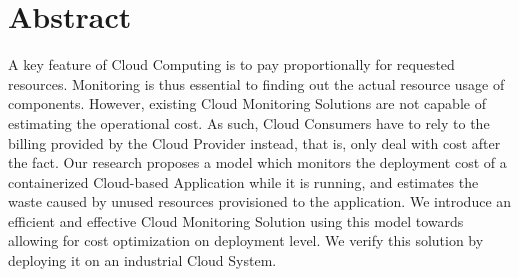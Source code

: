 \begingroup
\let\clearpage\relax
\let\cleardoublepage\relax
\let\cleardoublepage\relax

\chapter*{Abstract}
A key feature of Cloud Computing is to pay proportionally for requested resources. Monitoring is thus essential to finding out the actual resource usage of components. However, existing Cloud Monitoring Solutions are not capable of estimating the operational cost.
As such, Cloud Consumers have to rely to the billing provided by the Cloud Provider instead, that is, only deal with cost after the fact.
Our research proposes a model which monitors the deployment cost of a containerized Cloud-based Application while it is running, and estimates the waste caused by unused resources provisioned to the application. 
We introduce an efficient and effective Cloud Monitoring Solution using this model towards allowing for cost optimization on deployment level. We verify this solution by deploying it on an industrial Cloud System.
\vfill

\endgroup

\vfill
